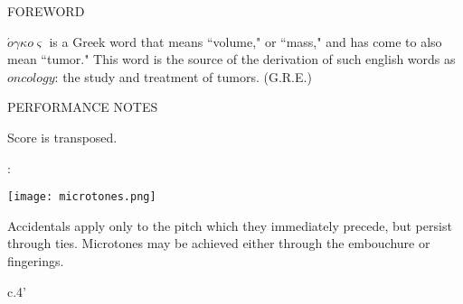 \documentclass[10pt]{article}
\begin{document}
\begin{center}
\huge FOREWORD
\end{center}

\begingroup
\begin{center}
\hspace{10mm} $\acute{o} \gamma \kappa o \varsigma$ is a Greek word that means ``volume," or ``mass," and has come to also mean ``tumor." This word is the source of the derivation of such english words as $oncology$: the study and treatment of tumors.
\rightskip\leftskip
\phantom{text} \hfill (G.R.E.)
\end{center}
\endgroup

\vspace*{1.5\baselineskip}

\vspace*{1\baselineskip}

\begin{center}
\huge PERFORMANCE NOTES
\end{center}

\begin{center}
Score is transposed.
\end{center}

\begin{center}
:
\end{center}

\begin{center}
\texttt{[image: microtones.png]}
\end{center}

\begin{center}
Accidentals apply only to the pitch which they immediately precede, but persist through ties. Microtones may be achieved either through the embouchure or fingerings.
\end{center}


\vspace*{1\baselineskip}

\begin{center}
c.4'
\end{center}
\end{document}
